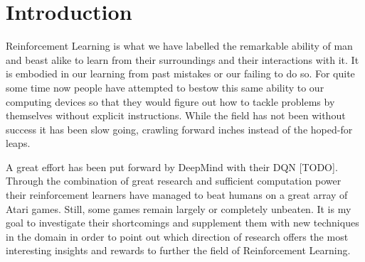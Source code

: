 \chapter{Introduction}

\label{introduction}
Reinforcement Learning is what we have labelled the remarkable ability of man and beast alike 
to learn from their surroundings and their interactions with it.
It is embodied in our learning from past mistakes or our failing to do so.
For quite some time now people have attempted to bestow this same ability to 
our computing devices so that they would figure out how to tackle problems by themselves
without explicit instructions.
While the field has not been without success
it has been slow going,
crawling forward inches instead of the hoped-for leaps.

A great effort has been put forward by DeepMind with their DQN [TODO].
Through the combination of great research and sufficient computation power
their reinforcement learners have managed to beat humans
on a great array of Atari games.
Still, some games remain largely or completely unbeaten.
It is my goal to investigate their shortcomings
and supplement them with new techniques in the domain
in order to point out which direction of research
offers the most interesting insights and rewards
to further the field of Reinforcement Learning. 